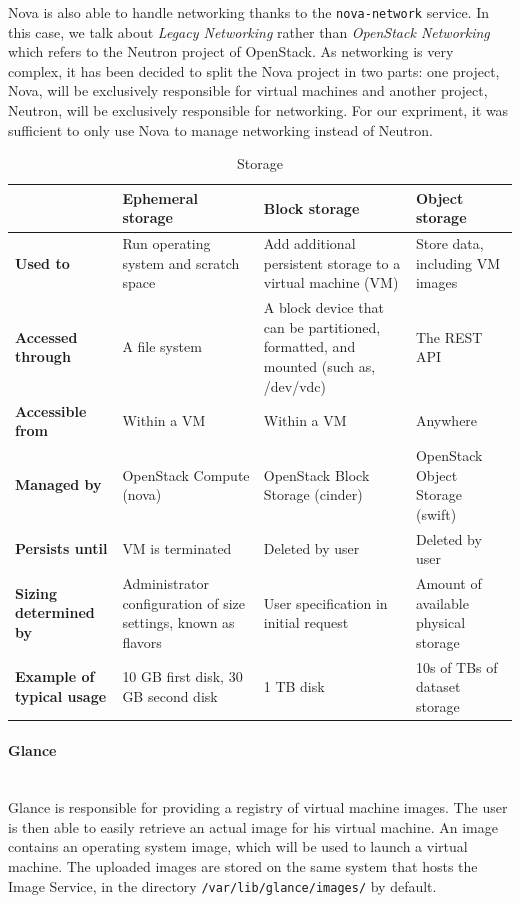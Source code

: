 Nova is also able to handle networking thanks to the \texttt{nova-network} service. 
In this case, we talk about \textit{Legacy Networking} rather than \textit{OpenStack Networking} which refers to the Neutron project of OpenStack. 
As networking is very complex, it has been decided to split the Nova project in two parts: one project, Nova, will be exclusively responsible for virtual machines and another project, Neutron, will be exclusively responsible for networking. 
For our expriment, it was sufficient to only use Nova to manage networking instead of Neutron.


\begin{table}[h]
	\centering
	\begin{tabular}{|m{2cm}|m{3.8cm}|m{3.8cm}|m{3.8cm}|}
		\hline
		 & 
		\textbf{Ephemeral \newline storage} & 
		\textbf{Block storage} & 
		\textbf{Object storage}\\
		\hline
		\textbf{Used to} & 
		Run operating system and scratch space & 
		Add additional persistent storage to a virtual machine (VM) & 
		Store data, including VM images \\
		\hline
		\textbf{Accessed through} & 
		A file system & 
		A block device that can be partitioned, formatted, and mounted (such as, /dev/vdc) & 
		The REST API \\
		\hline
		\textbf{Accessible from} & 
		Within a VM & 
		Within a VM & 
		Anywhere \\
		\hline
		\textbf{Managed by} & 
		OpenStack Compute (nova) & 
		OpenStack Block Storage (cinder) & 
		OpenStack Object Storage (swift) \\
		\hline
		\textbf{Persists until} & 
		VM is terminated & 
		Deleted by user & 
		Deleted by user \\
		\hline
		\textbf{Sizing determined by} & 
		Administrator configuration of size settings, known as flavors & 
		User specification in initial request & 
		Amount of available physical storage \\
		\hline
		\textbf{Example of typical usage} & 
		10 GB first disk, 30 GB second disk & 
		1 TB disk & 
		10s of TBs of dataset storage \\
		\hline
	\end{tabular}
	\caption{Storage \cite{stodec}}
	\label{table:storage_list}
\end{table}


\paragraph{Glance}\mbox{}\\
Glance is responsible for providing a registry of virtual machine images. 
The user is then able to easily retrieve an actual image for his virtual machine. 
An image contains an operating system image, which will be used to launch a virtual machine. 
The uploaded images are stored on the same system that hosts the Image Service, in the directory \texttt{/var/lib/glance/images/} by default.

